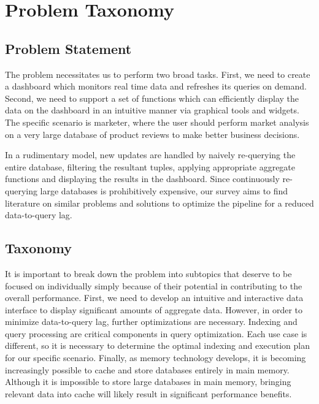 \chapter{Problem Taxonomy} %
\label{Problem} %

\section{Problem Statement} %
\label{Problem Statement} %

The problem necessitates us to perform two broad tasks. First, we need to create a dashboard which monitors real time data and refreshes its queries on demand. Second, we need to support a set of functions which can efficiently display the data on the dashboard in an intuitive manner via graphical tools and widgets. The specific scenario is marketer, where the user should perform market analysis on a very large database of product reviews to make better business decisions.

In a rudimentary model, new updates are handled by naively re-querying the entire database, filtering the resultant tuples, applying appropriate aggregate functions and displaying the results in the dashboard. Since continuously re-querying large databases is prohibitively expensive, our survey aims to find literature on similar problems and solutions to optimize the pipeline for a reduced data-to-query lag.

\section{Taxonomy}
\label{Taxonomy}
It is important to break down the problem into subtopics that deserve to be focused on individually simply because of their potential in contributing to the overall performance. First, we need to develop an intuitive and interactive data interface to display significant amounts of aggregate data. However, in order to minimize data-to-query lag, further optimizations are necessary. Indexing and query processing are critical components in query optimization. Each use case is different, so it is necessary to determine the optimal indexing and execution plan for our specific scenario. Finally, as memory technology develops, it is becoming increasingly possible to cache and store databases entirely in main memory. Although it is impossible to store large databases in main memory, bringing relevant data into cache will likely result in significant performance benefits.

